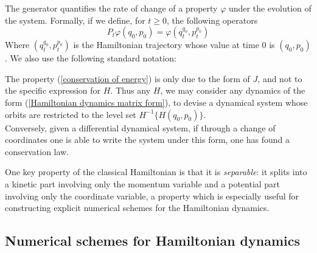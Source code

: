     The generator quantifies the rate of change of a property $\varphi$ under the evolution of the system. Formally, if we define, for $t\geq 0$, the following operators 
    $$P_t \varphi (q_0,p_0) = \varphi(q_t^{q_0},p_t^{p_0})$$
    Where $(q_t^{q_0},p_t^{p_0})$ is the Hamiltonian trajectory whose value at time 0 is $(q_0,p_0)$. We also use the following standard notation:

    \begin{remark}
        \label{non-separable hamiltonian}
        The property (\ref{conservation of energy}) is only due to the form of $J$, and not to the specific expression for $H$.
        Thus any $H$, we may consider any dynamics of the form (\ref{Hamiltonian dynamics matrix form}), to devise a dynamical system whose orbits are restricted to the level set $H^{-1}\{H(q_0,p_0)\}$.\\
        Conversely, given a differential dynamical system, if through a change of coordinates one is able to write the system under this form, one has found a conservation law.
    \end{remark}



    One key property of the classical Hamiltonian is that it is \textit{separable}: it splits into a kinetic part involving only the momentum variable and a potential part involving only the coordinate variable, a property which is especially useful for constructing explicit numerical schemes for the Hamiltonian dynamics.
        \label{evolution operator exponential notation}

    \subsection{Numerical schemes for Hamiltonian dynamics}

